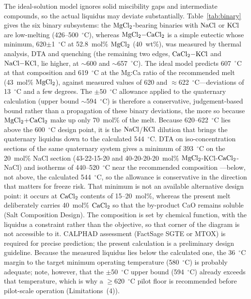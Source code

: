 \documentclass[pdflatex,sn-basic,Numbered]{sn-jnl}
\begin{document}
The ideal-solution model ignores solid miscibility gaps and intermediate compounds, so the actual liquidus may deviate substantially. Table~\ref{tab:binary} gives the six binary subsystems: the $\ce{MgCl2}$-bearing binaries with $\ce{NaCl}$ or $\ce{KCl}$ are low-melting (426--500~$^{\circ}$C), whereas $\ce{MgCl2-CaCl2}$ is a simple eutectic whose minimum, 620$\pm$1~$^{\circ}$C at 52.8~mol\% $\ce{MgCl2}$ (40~wt\%), was measured by thermal analysis, DTA and quenching \cite{grjotheim1970} (the remaining two edges, $\ce{CaCl2-KCl}$ and $\ce{NaCl-KCl}$, lie higher, at $\sim$600 and $\sim$657~$^{\circ}$C). The ideal model predicts 607~$^{\circ}$C at that composition and 619~$^{\circ}$C at the Mg:Ca ratio of the recommended melt (43~mol\% $\ce{MgCl2}$), against measured values of 620 and $\approx$622~$^{\circ}$C---deviations of 13~$^{\circ}$C and a few degrees. The $\pm$50~$^{\circ}$C allowance applied to the quaternary calculation (upper bound $\sim$594~$^{\circ}$C) is therefore a conservative, judgement-based bound rather than a propagation of these binary deviations, the more so because $\ce{MgCl2}$+$\ce{CaCl2}$ make up only 70~mol\% of the melt. Because 620--622~$^{\circ}$C lies above the 600~$^{\circ}$C design point, it is the $\ce{NaCl}$/$\ce{KCl}$ dilution that brings the quaternary liquidus down to the calculated 544~$^{\circ}$C. DTA on iso-concentration sections of the same quaternary system gives a minimum of 393~$^{\circ}$C on the 20~mol\% NaCl section (43-22-15-20 and 40-20-20-20~mol\% $\ce{MgCl2}$-KCl-$\ce{CaCl2}$-NaCl) and isotherms of 440--520~$^{\circ}$C near the recommended composition \cite{hattori1985}---below, not above, the calculated 544~$^{\circ}$C, so the allowance is conservative in the direction that matters for freeze risk. That minimum is not an available alternative design point: it occurs at $\ce{CaCl2}$ contents of 15--20~mol\%, whereas the present melt deliberately carries 40~mol\% $\ce{CaCl2}$ so that the by-product CaO remains soluble (Salt Composition Design). The composition is set by chemical function, with the liquidus a constraint rather than the objective, so that corner of the diagram is not accessible to it. CALPHAD assessment (FactSage SGTE or MTOX) is required for precise prediction; the present calculation is a preliminary design guideline. Because the measured liquidus lies below the calculated one, the 36~$^{\circ}$C margin to the target minimum operating temperature (580~$^{\circ}$C) is probably adequate; note, however, that the $\pm$50~$^{\circ}$C upper bound (594~$^{\circ}$C) already exceeds that temperature, which is why a $\geq$620~$^{\circ}$C pilot floor is recommended before pilot-scale operation (Limitations~(4)).
\end{document}
